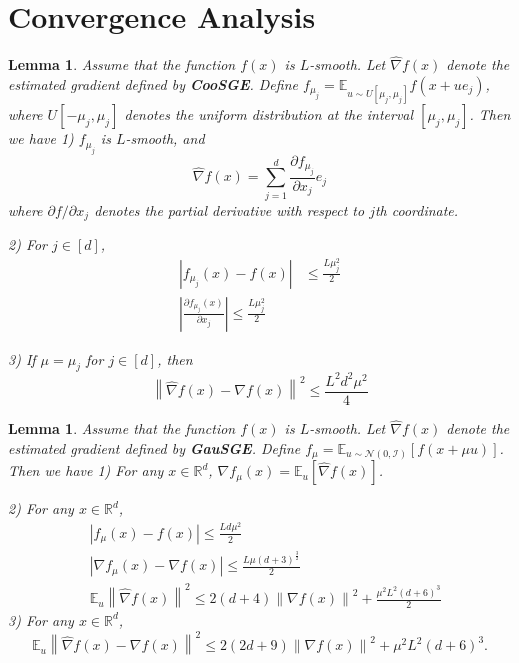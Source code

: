 \documentclass{article}
\newcommand*{\R}{\mathbb{R}}
\newcommand*{\E}{\mathbb{E}}
\newcommand{\norm}[1]{\left\lVert#1\right\rVert}
\newcommand{\abs}[1]{\left|#1\right|}
\newtheorem{lemma}[theorem]{Lemma}
\theoremstyle{definition}
\theoremstyle{remark}
\begin{document}
\section{Convergence Analysis}
\begin{lemma}\label{CooSGE}
Assume that the function $f(x)$ is $L$-smooth. Let $\hat{\nabla} f(x)$ denote the estimated gradient defined by {\bf CooSGE}. Define $f_{\mu_j} = \E_{u\sim U[\mu_j, \mu_j]} f(x+ue_j)$, where $U[-\mu_j,\mu_j]$ denotes the uniform distribution at the interval $[\mu_j, \mu_j]$. Then we have 
1) $f_{\mu_j}$ is $L$-smooth, and 
\begin{equation}
\hat{\nabla} f(x) = \sum_{j=1}^d \frac{\partial f_{\mu_j}}{\partial x_j}e_j
\end{equation} 
where $\partial f/\partial x_j$ denotes the partial derivative with respect to $j$th coordinate.

2) For $j\in [d]$, 
\begin{align}
\abs{f_{\mu_j}(x) - f(x)} &\leq \frac{L\mu_j^2}{2}\\
\abs{\frac{\partial f_{\mu_j}(x)}{\partial x_j}} \leq \frac{L\mu_j^2}{2}
\end{align}
 
 3) If $\mu = \mu_j$ for $j\in [d]$, then 
 \begin{equation}
 \norm{\hat{\nabla} f(x) - {\nabla} f(x)} ^2 \leq \frac{L^2 d^2 \mu^2}{4}
\end{equation}  
\end{lemma}
\begin{lemma}\label{GauSGE}
Assume that the function $f(x)$ is $L$-smooth. Let $\hat{\nabla} f(x)$ denote the estimated gradient defined by {\bf GauSGE}. Define $f_{\mu} = \E_{u\sim \mathcal{N(0, I)}} [f(x+\mu u)]$. Then we have 
1) For any $x\in \R^d$, $\nabla f_{\mu}(x) = \E_u [\hat{\nabla} f(x)]$.

2) For any $x\in \R^d$, 
 \begin{align}
&\abs{f_{\mu}(x) - f(x)} \leq \frac{L d \mu^2}{2}\\
&\abs{\nabla f_{\mu}(x) - \nabla f(x)} \leq \frac{L\mu(d+3)^{\frac{3}{2}}}{2}\\
&\E_u \norm{\hat{\nabla} f(x)}^2 \leq 2(d+4)\norm{{\nabla} f(x)}^2+ \frac{\mu^2L^2 (d+6)^3}{2}
\end{align}
3) For any $x\in \R^d$, 
\begin{equation}
\E_u  \norm{\hat{\nabla} f(x) - {\nabla} f(x)}^2 \leq 2(2d+9)\norm{\nabla f(x)}^2 + \mu^2 L^2 (d+6)^3.
\end{equation}
\end{lemma}
\end{document}
